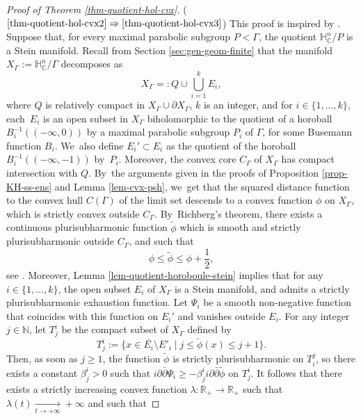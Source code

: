 \documentclass[JEP,XML,SOM,Unicode,NoEqCountersInSection,published]{cedram}
\theoremstyle{definition}
\newcommand{\C}{\mathbb{C}}
\newcommand{\R}{\mathbb{R}}
\newcommand{\N}{\mathbb{N}}
\newcommand{\HNC}{\mathbb{H}^{n}_{\C}}
\def\C{\mathbb{C}}
\newcommand{\HNC}{\mathbb{H}^{n}_{\C}}
\begin{document}
\begin{proof}[Proof of Theorem \ref{thm-quotient-hol-cvx}]
($\eqref{thm-quotient-hol-cvx2}\Rightarrow\eqref{thm-quotient-hol-cvx3}$) This proof is inspired by \cite[Proof of Th.\,1.4]{chenDiscreteGroupsHolomorphic2013}. Suppose that, for every maximal parabolic subgroup $P<\Gamma$, the quotient $\HNC/P$ is a Stein manifold. Recall from Section \ref{sec:gen-geom-finite} that the manifold $X_{\Gamma}:=\HNC/\Gamma$ decomposes as
\begin{equation*}
X_{\Gamma} =: Q \cup \bigcup_{i=1}^{k}E_i,
\end{equation*}
where $Q$ is relatively compact in $X_{\Gamma} \cup \partial X_{\Gamma}$, $k$ is an integer, and for $i\in \{1,\dots,k\}$, each~$E_i$ is an open subset in $X_{\Gamma}$ biholomorphic to the quotient of a horoball $B_i^{-1}((-\infty,0))$ by a maximal parabolic subgroup $P_i$ of $\Gamma$, for some Busemann function $B_i$. We~also define $E_i'\subset E_i$ as the quotient of the horoball $B_i^{-1}((-\infty,-1))$ by~$P_i$. Moreover, the convex core $C_{\Gamma}$ of $X_{\Gamma}$ has compact intersection with $Q$. By~the arguments given in the proofs of Proposition \ref{prop-KH-ss-ens} and Lemma \ref{lem-cvx-psh}, we~get that the squared distance function to the convex hull $C(\Gamma)$ of the limit set descends to a convex function $\phi$ on $X_{\Gamma}$, which is strictly convex outside $C_{\Gamma}$. By~Richberg's theorem, there exists a continuous plurisubharmonic function $\widetilde{\phi}$ which is smooth and strictly plurisubharmonic outside $C_{\Gamma}$, and such that
\begin{equation*}
\phi \le \widetilde{\phi} \le \phi + \frac{1}{2},
\end{equation*}see \cite[Th.\,I.5.21]{demaillyComplexAnalyticDifferential-manuel}. Moreover, Lemma \ref{lem-quotient-horoboule-stein} implies that for any $i\in \{1,\dots,k\}$, the open subset $E_i$ of $X_{\Gamma}$ is a Stein manifold, and admits a strictly plurisubharmonic exhaustion function. Let $\Psi_i$ be a smooth non-negative function that coincides with this function on $E_i'$ and vanishes outside $E_i$. For any integer $j\in \N$, let $T^{i}_j$ be the compact subset of $X_{\Gamma}$ defined by
\begin{equation*}
T^{i}_j:= \{x\in \overline{E_i}\setminus E'_i \mid j\le \widetilde{\phi}(x) \le j+1\}.
\end{equation*}
Then, as soon as $j\ge1$, the function $\widetilde{\phi}$ is strictly plurisubharmonic on $T_i^{j}$, so there exists a constant $\beta^{i}_j>0$ such that $i\partial\bar{\partial} \Psi_i \ge -\beta^{i}_j i\partial\bar{\partial} \widetilde{\phi}$ on $T^{i}_j$. It follows that there exists a strictly increasing convex function $\lambda:\R_{+}\to\R_{+}$ such that $\lambda(t)\underset{t\to+\infty}{\longrightarrow}+\infty$ and such that

\end{proof}
\end{document}
